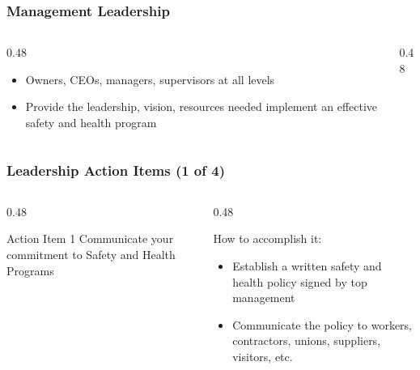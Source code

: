 \begin{frame}
    \frametitle{Management Leadership}
    \begin{columns}
        \begin{column}{0.48\linewidth}
            \begin{itemize}[<+- | alert@+>]
                \item Owners, CEOs, managers, supervisors at all levels
                \item Provide the leadership, vision, resources needed implement an effective safety and health program
            \end{itemize}
        \end{column}
        \begin{column}{0.48\linewidth}
        \end{column}
    \end{columns}
\end{frame}

\begin{frame}
    \frametitle{Leadership Action Items (1 of 4)}

    \begin{columns}[t]
        \begin{column}{0.48\linewidth}
            \begin{block}{Action Item 1}
                Communicate your commitment to Safety and Health Programs
            \end{block}
        \end{column}
        \begin{column}{0.48\linewidth}
            \begin{block}{How to accomplish it:}
                \begin{itemize}[<+- | alert@+>]
                    \item Establish a written safety and health policy signed by top management
                    \item Communicate the policy to workers, contractors, unions, suppliers, visitors, etc.
                \end{itemize}
            \end{block}
        \end{column}
    \end{columns}
\end{frame}

